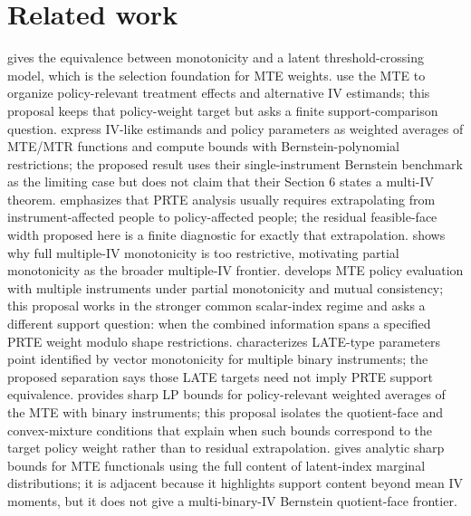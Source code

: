 \documentclass[11pt]{article}
\theoremstyle{definition}
\theoremstyle{plain}
\theoremstyle{remark}
\begin{document}
\section{Related work}
\citet{Vytlacil2002} gives the equivalence between monotonicity and a latent threshold-crossing model, which is the selection foundation for MTE weights. \citet{HeckmanVytlacil2005} use the MTE to organize policy-relevant treatment effects and alternative IV estimands; this proposal keeps that policy-weight target but asks a finite support-comparison question. \citet{MogstadSantosTorgovitsky2018} express IV-like estimands and policy parameters as weighted averages of MTE/MTR functions and compute bounds with Bernstein-polynomial restrictions; the proposed result uses their single-instrument Bernstein benchmark as the limiting case but does not claim that their Section 6 states a multi-IV theorem. \citet{MogstadTorgovitsky2018Review} emphasizes that PRTE analysis usually requires extrapolating from instrument-affected people to policy-affected people; the residual feasible-face width proposed here is a finite diagnostic for exactly that extrapolation. \citet{MogstadTorgovitskyWalters2021} shows why full multiple-IV monotonicity is too restrictive, motivating partial monotonicity as the broader multiple-IV frontier. \citet{MogstadTorgovitskyWalters2024} develops MTE policy evaluation with multiple instruments under partial monotonicity and mutual consistency; this proposal works in the stronger common scalar-index regime and asks a different support question: when the combined information spans a specified PRTE weight modulo shape restrictions. \citet{Goff2024} characterizes LATE-type parameters point identified by vector monotonicity for multiple binary instruments; the proposed separation says those LATE targets need not imply PRTE support equivalence. \citet{HanYang2024} provides sharp LP bounds for policy-relevant weighted averages of the MTE with binary instruments; this proposal isolates the quotient-face and convex-mixture conditions that explain when such bounds correspond to the target policy weight rather than to residual extrapolation. \citet{Marx2024} gives analytic sharp bounds for MTE functionals using the full content of latent-index marginal distributions; it is adjacent because it highlights support content beyond mean IV moments, but it does not give a multi-binary-IV Bernstein quotient-face frontier.
\end{document}
